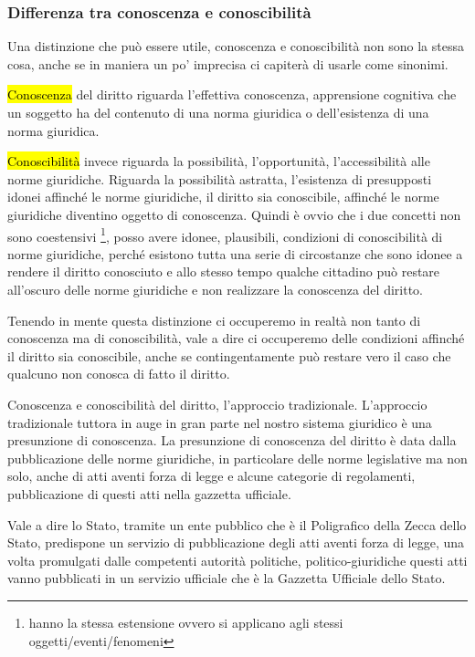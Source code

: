 \subsubsection{Differenza tra conoscenza e conoscibilità}
Una distinzione che può essere utile, conoscenza e conoscibilità non sono la stessa cosa, anche se in maniera un po' imprecisa ci capiterà di usarle come sinonimi.

\hl{Conoscenza} del diritto riguarda l'effettiva conoscenza, apprensione cognitiva che un soggetto ha del contenuto di una norma giuridica o dell'esistenza di una norma giuridica. 

\hl{Conoscibilità} invece riguarda la possibilità, l'opportunità, l'accessibilità alle norme giuridiche. Riguarda la possibilità astratta, l'esistenza di presupposti idonei affinché le norme giuridiche, il diritto sia conoscibile, affinché le norme giuridiche diventino oggetto di conoscenza. Quindi è ovvio che i due concetti non sono coestensivi \footnote{hanno la stessa estensione ovvero si applicano agli stessi oggetti/eventi/fenomeni}, posso avere idonee, plausibili, condizioni di conoscibilità di norme giuridiche, perché esistono tutta una serie di circostanze che sono idonee a rendere il diritto conosciuto e allo stesso tempo qualche cittadino può restare all'oscuro delle norme giuridiche e non realizzare la conoscenza del diritto.

Tenendo in mente questa distinzione ci occuperemo in realtà non tanto di conoscenza ma di conoscibilità, vale a dire ci occuperemo delle condizioni affinché il diritto sia conoscibile, anche se contingentamente può restare vero il caso che qualcuno non conosca di fatto il diritto. 

Conoscenza e conoscibilità del diritto, l'approccio tradizionale. 
L'approccio tradizionale tuttora in auge in gran parte nel nostro sistema giuridico è una presunzione di conoscenza. La presunzione di conoscenza del diritto è data dalla pubblicazione delle norme giuridiche, in particolare delle norme legislative ma non solo, anche di atti aventi forza di legge e alcune categorie di regolamenti, pubblicazione di questi atti nella gazzetta ufficiale.

Vale a dire lo Stato, tramite un ente pubblico che è il Poligrafico della Zecca dello Stato, predispone un servizio di pubblicazione degli atti aventi forza di legge, una volta promulgati dalle competenti autorità politiche, politico-giuridiche questi atti vanno pubblicati in un servizio ufficiale che è la Gazzetta Ufficiale dello Stato.

